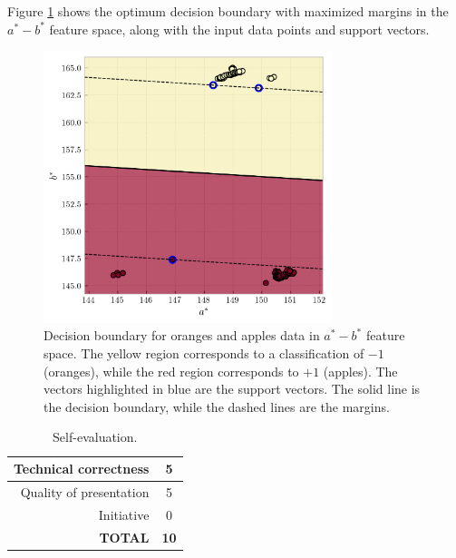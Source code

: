 \documentclass[12pt,a4paper]{article}
\begin{document}
\noindent Figure \ref{fig:svm-db} shows the optimum decision boundary with maximized margins in the $a^*-b^*$ feature space, along with the input data points and support vectors.

\begin{figure}[htb]
	\centering
	\includegraphics[width=0.75\textwidth]{svm-db.png}
	\caption{Decision boundary for oranges and apples data in $a^*-b^*$ feature space. The yellow region corresponds to a classification of $-1$ (oranges), while the red region corresponds to $+1$ (apples). The vectors highlighted in blue are the support vectors. The solid line is the decision boundary, while the dashed lines are the margins.}
	\label{fig:svm-db}
\end{figure}

\clearpage
\begin{table}[!htb]
	\centering
	\caption{Self-evaluation.}
	\begin{tabular}{||r|c||}
		\hline
		Technical correctness & 5 \\ \hline
		Quality of presentation & 5 \\ \hline
		Initiative & 0 \\ \hline
		\textbf{TOTAL} & \textbf{10} \\ \hline
	\end{tabular}
	\label{tab:self-eval}
\end{table}



\end{document}
